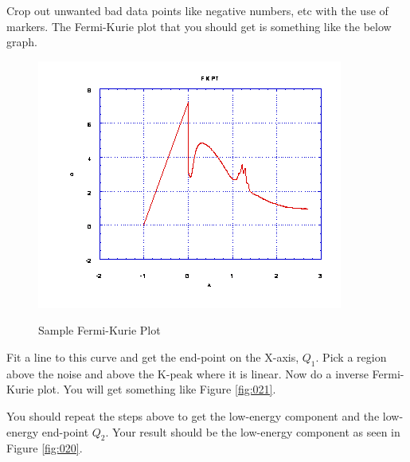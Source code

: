\documentclass{../lab}
\begin{document}
Crop out unwanted bad data points like negative numbers, etc with the use of markers. The Fermi-Kurie plot that you should get is something like the below graph.
\begin{figure}[h]
\centering
    \href{http://experimentationlab.berkeley.edu/sites/default/files/images/BRAimage019.gif}{\includegraphics[width=0.5\linewidth]{images/BRAimage019.png}}
    \caption{Sample Fermi-Kurie Plot}
\end{figure}

Fit a line to this curve and get the end-point on the X-axis, $Q_1$. Pick a region above the noise and above the K-peak where it is linear. Now do a inverse Fermi-Kurie plot. You will get something like Figure \ref{fig:021}.

You should repeat the steps above to get the low-energy component and the low-energy end-point $Q_2$. Your result should be the low-energy component as seen in Figure \ref{fig:020}.
\end{document}
